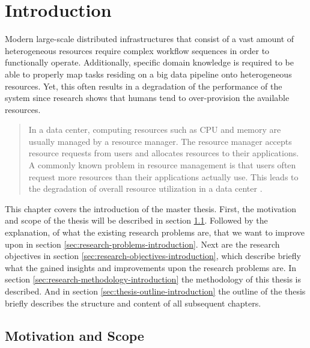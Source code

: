 \chapter{Introduction}
\label{ch:introduction}

    Modern large-scale distributed infrastructures that consist of a vast amount of heterogeneous resources require complex workflow sequences in order to functionally operate. Additionally, specific domain knowledge is required to be able to properly map tasks residing on a big data pipeline onto heterogeneous resources. Yet, this often results in a degradation of the performance of the system since research shows that humans tend to over-provision the available resources.

    \begin{quote}
        In a data center, computing resources such as CPU and memory are usually managed by a resource manager. The resource manager accepts resource requests from users and allocates resources to their applications. A commonly known problem in resource management is that users often request more resources than their applications actually use. This leads to the degradation of overall resource utilization in a data center \cite{thonglekImprovingResourceUtilization2019}.
    \end{quote}

    This chapter covers the introduction of the master thesis.
    First, the motivation and scope of the thesis will be described in section \ref{sec:motivation-and-scope-introduction}.
    Followed by the explanation, of what the existing research problems are, that we want to improve upon in section \ref{sec:research-problems-introduction}. Next are the research objectives in section \ref{sec:research-objectives-introduction}, which describe briefly what the gained insights and improvements upon the research problems are. In section \ref{sec:research-methodology-introduction} the methodology of this thesis is described. And in section \ref{sec:thesis-outline-introduction} the outline of the thesis briefly describes the structure and content of all subsequent chapters.

        \section{Motivation and Scope}
        \label{sec:motivation-and-scope-introduction}

